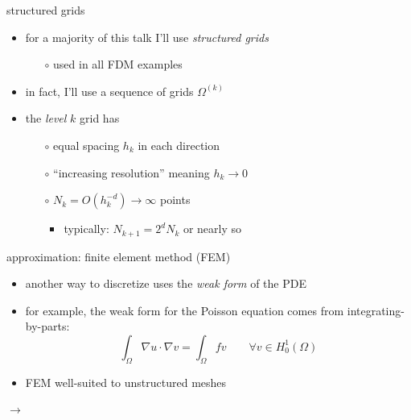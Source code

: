 \documentclass[hide notes,intlimits,usenames,dvipsnames]{beamer}
\newcommand{\grad}{\nabla}
\begin{document}
\begin{frame}{structured grids}
\begin{itemize}
\item for a majority of this talk I'll use \emph{structured grids}
	\begin{itemize}
	\item[$\circ$] used in all FDM examples
	\end{itemize}
\item in fact, I'll use a sequence of grids $\Omega^{(k)}$
\item the \emph{level} $k$ grid has
	\begin{itemize}
	\item[$\circ$] equal spacing $h_k$ in each direction
	\item[$\circ$] ``increasing resolution'' meaning $h_k \to 0$
    \item[$\circ$] $N_k = O(h_k^{-d}) \to \infty$ points
	    \begin{itemize}
	    \item typically: $N_{k+1} = 2^d N_k$ or nearly so
	    \end{itemize}
	\end{itemize}

\bigskip

\end{itemize}
\end{frame}


\begin{frame}{approximation: finite element method (FEM)}
\begin{itemize}
\item another way to discretize uses the \emph{weak form} of the PDE
\item for example, the weak form for the Poisson equation comes from integrating-by-parts:
    $$\int_\Omega \grad u \cdot \grad v = \int_\Omega f v \qquad \forall v \in H_0^1(\Omega)$$
\item FEM well-suited to unstructured meshes
\end{itemize}

\begin{center}
\begin{tikzpicture}[scale=1.5,baseline]  \end{tikzpicture}
\qquad $\to$ \qquad
\begin{tikzpicture}[scale=1.5,baseline]  \end{tikzpicture}
\end{center}
\end{frame}
\end{document}
